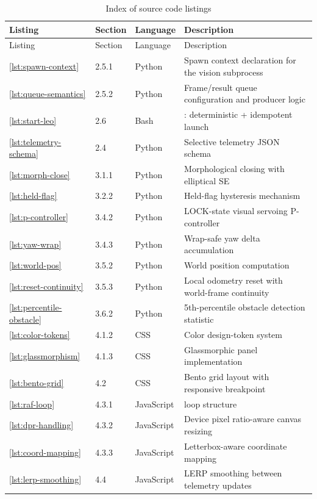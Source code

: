 \begingroup\small
\begin{longtable}{@{}L{2.6cm}L{1.4cm}L{1.8cm}L{7.4cm}@{}}
\caption{Index of source code listings} \label{tab:listing-index} \\
\toprule
Listing & Section & Language & Description \\
\midrule
\endfirsthead
\toprule
Listing & Section & Language & Description \\
\midrule
\endhead
\ref{lst:spawn-context} & 2.5.1 & Python & Spawn context declaration for the vision subprocess \\
\ref{lst:queue-semantics} & 2.5.2 & Python & Frame/result queue configuration and producer logic \\
\ref{lst:start-leo} & 2.6 & Bash & : deterministic  + idempotent launch \\
\ref{lst:telemetry-schema} & 2.4 & Python & Selective telemetry JSON schema \\
\ref{lst:morph-close} & 3.1.1 & Python & Morphological closing with elliptical SE \\
\ref{lst:held-flag} & 3.2.2 & Python & Held-flag hysteresis mechanism \\
\ref{lst:p-controller} & 3.4.2 & Python & LOCK-state visual servoing P-controller \\
\ref{lst:yaw-wrap} & 3.4.3 & Python & Wrap-safe yaw delta accumulation \\
\ref{lst:world-pos} & 3.5.2 & Python & World position computation \\
\ref{lst:reset-continuity} & 3.5.3 & Python & Local odometry reset with world-frame continuity \\
\ref{lst:percentile-obstacle} & 3.6.2 & Python & 5th-percentile obstacle detection statistic \\
\ref{lst:color-tokens} & 4.1.2 & CSS & Color design-token system \\
\ref{lst:glassmorphism} & 4.1.3 & CSS & Glassmorphic panel implementation \\
\ref{lst:bento-grid} & 4.2 & CSS & Bento grid layout with responsive breakpoint \\
\ref{lst:raf-loop} & 4.3.1 & JavaScript &  loop structure \\
\ref{lst:dpr-handling} & 4.3.2 & JavaScript & Device pixel ratio-aware canvas resizing \\
\ref{lst:coord-mapping} & 4.3.3 & JavaScript & Letterbox-aware coordinate mapping \\
\ref{lst:lerp-smoothing} & 4.4 & JavaScript & LERP smoothing between telemetry updates \\

\end{longtable}
